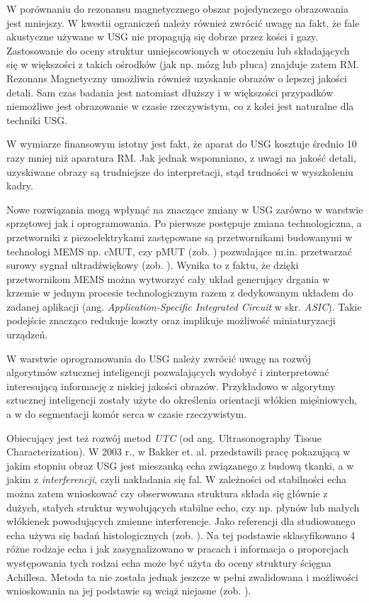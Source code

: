 W porównaniu do rezonansu magnetycznego obszar pojedynczego obrazowania jest mniejszy. W kwestii ograniczeń należy również zwrócić uwagę na fakt, że fale akustyczne używane w USG nie propagują się dobrze przez kości i gazy. Zastosowanie do oceny struktur umiejscowionych w otoczeniu lub składających się w większości z takich ośrodków (jak np. mózg lub płuca) znajduje zatem RM. Rezonans Magnetyczny umożliwia również uzyskanie obrazów o lepszej jakości detali. Sam czas badania jest natomiast dłuższy i w większości przypadków niemożliwe jest obrazowanie w czasie rzeczywistym, co z kolei jest naturalne dla techniki USG.

W wymiarze finansowym istotny jest fakt, że aparat do USG kosztuje średnio 10 razy mniej niż aparatura RM. Jak jednak wspomniano, z uwagi na jakość detali, uzyskiwane obrazy są trudniejsze do interpretacji, stąd trudności w  wyszkoleniu kadry. 

Nowe rozwiązania mogą wpłynąć na znaczące zmiany w USG zarówno w warstwie sprzętowej jak i oprogramowania. Po pierwsze postępuje zmiana technologiczna, a przetworniki z piezoelektrykami zastępowane są przetwornikami budowanymi \linebreak w technologi MEMS np. cMUT, czy pMUT (zob. \cite{Butterfly2018})  pozwalające m.in. przetwarzać surowy sygnał ultradźwiękowy (zob. \cite{US4US}). Wynika to z faktu, że dzięki przetwornikom MEMS można wytworzyć cały układ generujący drgania w krzemie w jednym procesie technologicznym razem z dedykowanym układem do zadanej aplikacji (ang. \textit{Application-Specific Integrated Circuit} w skr. \textit{ASIC}). Takie podejście znacząco redukuje koszty oraz implikuje możliwość miniaturyzacji urządzeń.

W warstwie oprogramowania do USG należy zwrócić uwagę na rozwój algorytmów sztucznej inteligencji pozwalających wydobyć i zinterpretować interesującą informację z niskiej jakości obrazów. Przykładowo w \cite{Cunningham2017} algorytmy sztucznej inteligencji zostały użyte do określenia orientacji włókien mięśniowych, a w \cite{NVIDIA-CLARA} \linebreak do segmentacji komór serca w czasie rzeczywistym. 

Obiecujący jest też rozwój metod \textit{UTC} (od ang. Ultrasonography Tissue Characterization). W 2003 r., w \cite{Bakker2003} Bakker et. al. przedstawili pracę pokazującą w jakim stopniu obraz USG jest mieszanką echa związanego z budową tkanki, a w jakim z \textit{interferencji}, czyli nakładania się fal. W zależności od stabilności echa można zatem wnioskować czy obserwowana struktura składa się głównie z dużych, stałych struktur wywołujących stabilne echo, czy np. płynów lub małych włókienek powodujących zmienne interferencje. Jako referencji dla studiowanego echa używa się badań histologicznych (zob. \cite{Bakker2000}). Na tej podstawie sklasyfikowano 4 różne rodzaje echa i jak zasygnalizowano w pracach \cite{vanSchie2009} i \cite{Heyward2018} informacja o proporcjach występowania tych rodzai echa może być użyta do oceny struktury ścięgna Achillesa. Metoda ta nie została jednak jeszcze w pełni zwalidowana i możliwości wnioskowania na jej podstawie \linebreak są wciąż niejasne (zob. \cite{Heyward2018}).

